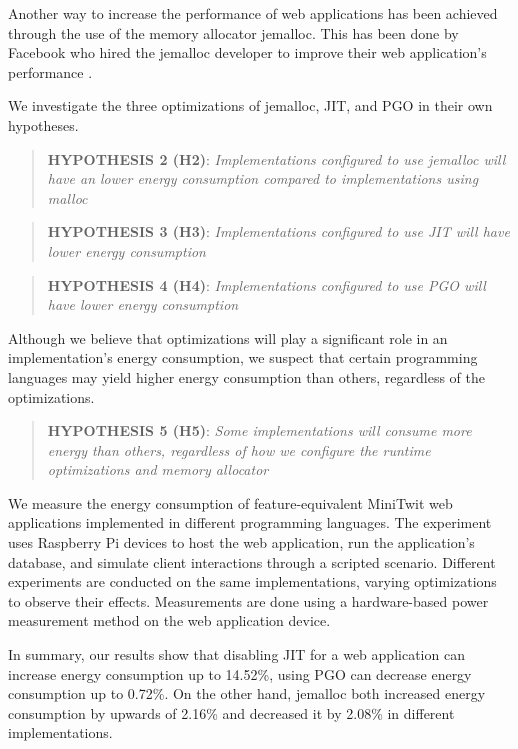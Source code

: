 \documentclass[../main.tex]{subfiles}
\begin{document}
Another way to increase the performance of web applications has been achieved through the use of the memory allocator jemalloc. This has been done by Facebook who hired the jemalloc developer to improve their web application's performance \cite{facebook-jemalloc}. 

We investigate the three optimizations of jemalloc, JIT, and PGO in their own hypotheses.

\begin{quote}
    \textbf{HYPOTHESIS 2 (H2)}: \emph{Implementations configured to use jemalloc will have an lower energy consumption compared to implementations using malloc}
\end{quote}

\begin{quote}
    \textbf{HYPOTHESIS 3 (H3)}: \emph{Implementations configured to use JIT will have lower energy consumption}
\end{quote}

\begin{quote}
    \textbf{HYPOTHESIS 4 (H4)}: \emph{Implementations configured to use PGO will have lower energy consumption}
\end{quote}

Although we believe that optimizations will play a significant role in an implementation's energy consumption, we suspect that certain programming languages may yield higher energy consumption than others, regardless of the optimizations. 

\begin{quote}
    \textbf{HYPOTHESIS 5 (H5)}: \emph{Some implementations will consume more energy than others, regardless of how we configure the runtime optimizations and memory allocator}
\end{quote}

We measure the energy consumption of feature-equivalent MiniTwit web applications implemented in different programming languages. The experiment uses Raspberry Pi devices to host the web application, run the application’s database, and simulate client interactions through a scripted scenario. Different experiments are conducted on the same implementations, varying optimizations to observe their effects. Measurements are done using a hardware-based power measurement method on the web application device.

In summary, our results show that disabling JIT for a web application can increase energy consumption up to 14.52\%, using PGO can decrease energy consumption up to 0.72\%. On the other hand, jemalloc both increased energy consumption by upwards of 2.16\% and decreased it by 2.08\% in different implementations.
\end{document}
